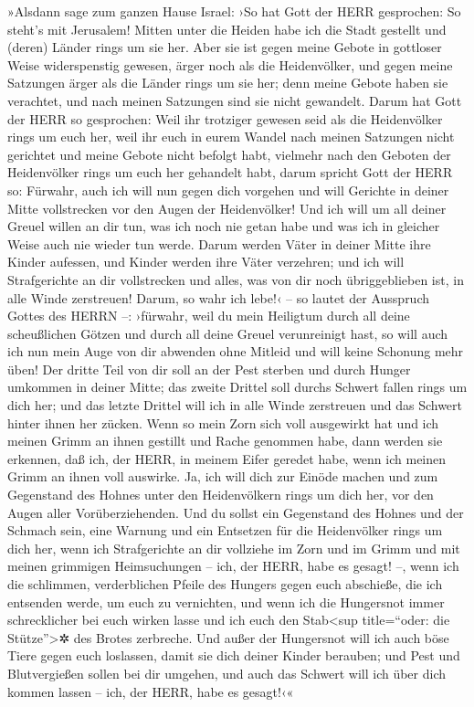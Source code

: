»Alsdann sage zum ganzen Hause Israel: ›So hat Gott der
HERR gesprochen: So steht's mit Jerusalem! Mitten unter die Heiden habe
ich die Stadt gestellt und (deren) Länder rings um sie her.
Aber sie ist gegen meine Gebote in gottloser Weise
widerspenstig gewesen, ärger noch als die Heidenvölker, und gegen meine
Satzungen ärger als die Länder rings um sie her; denn meine Gebote haben
sie verachtet, und nach meinen Satzungen sind sie nicht gewandelt.
Darum hat Gott der HERR so gesprochen: Weil ihr trotziger
gewesen seid als die Heidenvölker rings um euch her, weil ihr euch in
eurem Wandel nach meinen Satzungen nicht gerichtet und meine Gebote
nicht befolgt habt, vielmehr nach den Geboten der Heidenvölker rings um
euch her gehandelt habt, darum spricht Gott der HERR so:
Fürwahr, auch ich will nun gegen dich vorgehen und will Gerichte in
deiner Mitte vollstrecken vor den Augen der Heidenvölker!
Und ich will um all deiner Greuel willen an dir tun, was
ich noch nie getan habe und was ich in gleicher Weise auch nie wieder
tun werde. Darum werden Väter in deiner Mitte ihre Kinder
aufessen, und Kinder werden ihre Väter verzehren; und ich will
Strafgerichte an dir vollstrecken und alles, was von dir noch
übriggeblieben ist, in alle Winde zerstreuen! Darum, so
wahr ich lebe!‹ -- so lautet der Ausspruch Gottes des HERRN --:
›fürwahr, weil du mein Heiligtum durch all deine scheußlichen Götzen und
durch all deine Greuel verunreinigt hast, so will auch ich nun mein Auge
von dir abwenden ohne Mitleid und will keine Schonung mehr üben!
Der dritte Teil von dir soll an der Pest sterben und
durch Hunger umkommen in deiner Mitte; das zweite Drittel soll durchs
Schwert fallen rings um dich her; und das letzte Drittel will ich in
alle Winde zerstreuen und das Schwert hinter ihnen her zücken.
Wenn so mein Zorn sich voll ausgewirkt hat und ich meinen
Grimm an ihnen gestillt und Rache genommen habe, dann werden sie
erkennen, daß ich, der HERR, in meinem Eifer geredet habe, wenn ich
meinen Grimm an ihnen voll auswirke. Ja, ich will dich
zur Einöde machen und zum Gegenstand des Hohnes unter den Heidenvölkern
rings um dich her, vor den Augen aller Vorüberziehenden.
Und du sollst ein Gegenstand des Hohnes und der Schmach
sein, eine Warnung und ein Entsetzen für die Heidenvölker rings um dich
her, wenn ich Strafgerichte an dir vollziehe im Zorn und im Grimm und
mit meinen grimmigen Heimsuchungen -- ich, der HERR, habe es gesagt! --,
wenn ich die schlimmen, verderblichen Pfeile des Hungers
gegen euch abschieße, die ich entsenden werde, um euch zu vernichten,
und wenn ich die Hungersnot immer schrecklicher bei euch wirken lasse
und ich euch den Stab\textless sup title=``oder: die
Stütze''\textgreater✲ des Brotes zerbreche. Und außer der
Hungersnot will ich auch böse Tiere gegen euch loslassen, damit sie dich
deiner Kinder berauben; und Pest und Blutvergießen sollen bei dir
umgehen, und auch das Schwert will ich über dich kommen lassen -- ich,
der HERR, habe es gesagt!‹«


